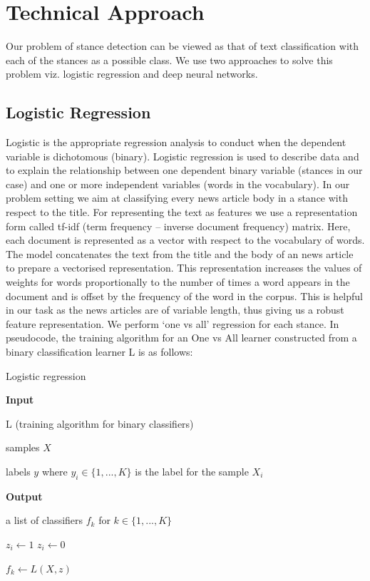 \documentclass[11.5pt]{article}
\begin{document}
\section{Technical Approach}

Our problem of stance detection can be viewed as that of text classification with each of the stances as a possible class. We use two approaches to solve this problem viz. logistic regression and deep neural networks.

\subsection{Logistic Regression}

Logistic is the appropriate regression analysis to conduct when the dependent variable is dichotomous (binary). Logistic regression is used to describe data and to explain the relationship between one dependent binary variable (stances in our case) and one or more independent variables (words in the vocabulary). 
In our problem setting we aim at classifying every news article body in a stance with respect to the title. For representing the text as features we use a representation form called tf-idf (term frequency – inverse document frequency) matrix. Here, each document is represented as a vector with respect to the vocabulary of words. The model concatenates the text from the title and the body of an news article to prepare a vectorised representation. This representation increases the values of weights for words proportionally to the number of times a word appears in the document and is offset by the frequency of the word in the corpus. This is helpful in our task as the news articles are of variable length, thus giving us a robust feature representation. We perform ‘one vs all’ regression for each stance. 
In pseudocode, the training algorithm for an One vs All learner constructed from a binary classification learner L is as follows:

\begin{algorithm}[H]
  \caption{Logistic regression}\label{logistic}
  \textbf{Input}

  \hspace*{\algorithmicindent}L (training algorithm for binary classifiers)

  \hspace*{\algorithmicindent}samples $X$

  \hspace*{\algorithmicindent}labels $y$ where $y_i \in \{1, ..., K\}$ is the label for the sample $X_i$ 

  \textbf{Output}

  \hspace*{\algorithmicindent}a list of classifiers $f_k$ for $k \in \{1, ..., K\}$

  \begin{algorithmic}[1]
    \State $z_i \gets 1$
    \Else
    \State $z_i \gets 0$
    \EndIf

	\State $f_k\gets L(X, z)$
    \EndFor
    \EndProcedure
  \end{algorithmic}
\end{algorithm}
\end{document}
